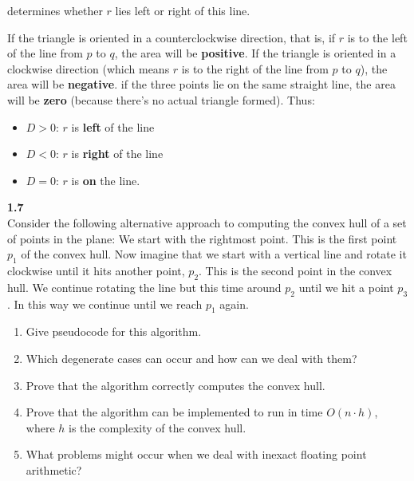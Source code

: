 determines whether $r$ lies left or right of this line.


If the triangle is oriented in a counterclockwise direction, that is, if $r$ is to the left of the line from $p$ to $q$, the area will be \textbf{positive}. If the triangle is oriented in a clockwise direction (which means $r$ is to the right of the line from $p$ to $q$), the area will be \textbf{negative}. if the three points lie on the same straight line, the area will be \textbf{zero} (because there's no actual triangle formed). Thus:

\begin{itemize}
	\item $D > 0$: $r$ is \textbf{left} of the line
	\item $D < 0$: $r$ is \textbf{right} of the line
	\item $D = 0$: $r$ is \textbf{on} the line.
\end{itemize}
\noindent
\textbf{1.7}\\
\noindent
Consider the following alternative approach to computing the convex hull of a set of points in the plane: We start with the rightmost point. This is the first point $p_{1}$ of the convex hull. Now imagine that we start with a vertical line and rotate it clockwise until it hits another point, $p_{2}$. This is the second point in the convex hull. We continue rotating the line but this time around $p_{2}$ until we hit a point $p_{3}$. In this way we continue until we reach $p_{1}$ again.

\begin{enumerate}
	\item Give pseudocode for this algorithm.
	\item Which degenerate cases can occur and how can we deal with them?
	\item Prove that the algorithm correctly computes the convex hull.
	\item Prove that the algorithm can be implemented to run in time $O(n \cdot h)$, where $h$ is the complexity of the convex hull.
	\item What problems might occur when we deal with inexact floating point arithmetic?
\end{enumerate}



